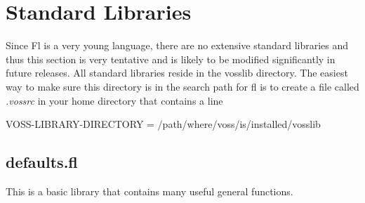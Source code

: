 \section{Standard Libraries}

Since Fl is a very young language, there are no extensive
standard libraries%
%
{} and thus this section is very tentative and is likely
to be modified significantly in future releases.
All standard libraries reside in the vosslib%
%
{} directory.
The easiest way to make sure this directory is in the search path
for fl is to create a file called {\em .vossrc} in your home directory
that contains a line
\begin{hol}
VOSS-LIBRARY-DIRECTORY = /path/where/voss/is/installed/vosslib
\end{hol}

\subsection{defaults.fl}

This is a basic library that contains many useful general functions.

